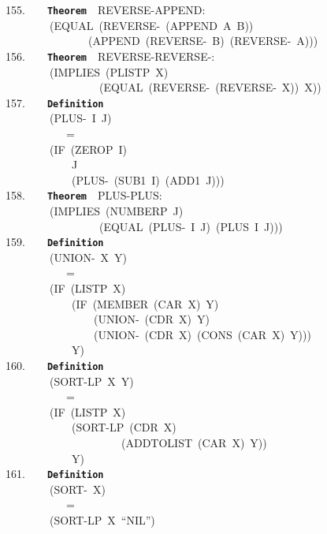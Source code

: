 \documentclass[11pt]{book}
\newenvironment{pubasis}{\begin{flushleft}\ttfamily\small}{\normalsize\rmfamily\end{flushleft}}
\newcommand{\axiomordefinition}[1]{\vspace{6pt}\texttt{\textbf{#1}}}
\begin{document}
\begin{pubasis}
155.~~~~\axiomordefinition{Theorem}~~REVERSE-APPEND:\\
~~~~~~~~(EQUAL~(REVERSE-~(APPEND~A~B))\\
~~~~~~~~~~~~~~~(APPEND~(REVERSE-~B)~(REVERSE-~A)))\\

156.~~~~\axiomordefinition{Theorem}~~REVERSE-REVERSE-:\\
~~~~~~~~(IMPLIES~(PLISTP~X)\\
~~~~~~~~~~~~~~~~~(EQUAL~(REVERSE-~(REVERSE-~X))~X))\\

157.~~~~\axiomordefinition{Definition}\\
~~~~~~~~(PLUS-~I~J)\\
~~~~~~~~~~~=\\
~~~~~~~~(IF~(ZEROP~I)\\
~~~~~~~~~~~~J\\
~~~~~~~~~~~~(PLUS-~(SUB1~I)~(ADD1~J)))\\

158.~~~~\axiomordefinition{Theorem}~~PLUS-PLUS:\\
~~~~~~~~(IMPLIES~(NUMBERP~J)\\
~~~~~~~~~~~~~~~~~(EQUAL~(PLUS-~I~J)~(PLUS~I~J)))\\

159.~~~~\axiomordefinition{Definition}\\
~~~~~~~~(UNION-~X~Y)\\
~~~~~~~~~~~=\\
~~~~~~~~(IF~(LISTP~X)\\
~~~~~~~~~~~~(IF~(MEMBER~(CAR~X)~Y)\\
~~~~~~~~~~~~~~~~(UNION-~(CDR~X)~Y)\\
~~~~~~~~~~~~~~~~(UNION-~(CDR~X)~(CONS~(CAR~X)~Y)))\\
~~~~~~~~~~~~Y)\\

160.~~~~\axiomordefinition{Definition}\\
~~~~~~~~(SORT-LP~X~Y)\\
~~~~~~~~~~~=\\
~~~~~~~~(IF~(LISTP~X)\\
~~~~~~~~~~~~(SORT-LP~(CDR~X)\\
~~~~~~~~~~~~~~~~~~~~~(ADDTOLIST~(CAR~X)~Y))\\
~~~~~~~~~~~~Y)\\

161.~~~~\axiomordefinition{Definition}\\
~~~~~~~~(SORT-~X)\\
~~~~~~~~~~~=\\
~~~~~~~~(SORT-LP~X~``NIL'')\\


\end{pubasis}
\end{document}
